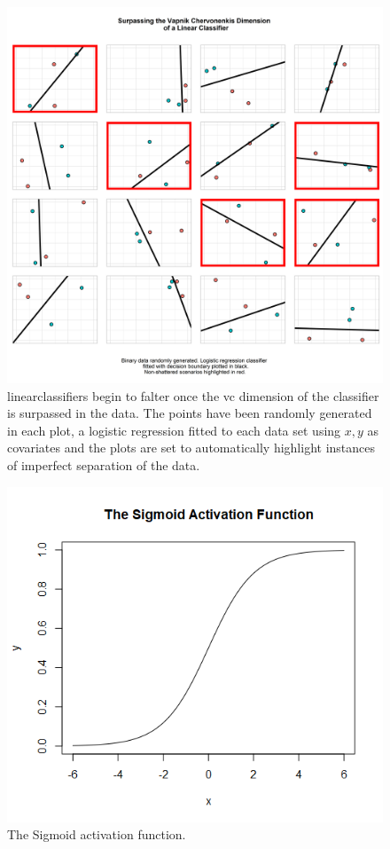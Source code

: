 \begin{figure}[h]
    \centering
    \includegraphics[width=120mm]{figs/vc_4.png}
    \caption[Surpassing the \gls{vc} dimension of a linear classifier - the data is not always shattered.]{\Gls{linearclassifier}s begin to falter once the \gls{vc} dimension of the classifier is surpassed in the data. The points have been randomly generated in each plot, a logistic regression fitted to each data set using $x, y$ as covariates and the plots are set to automatically highlight instances of imperfect separation of the data.}
    \label{fig:vc_4}
\end{figure}

\begin{figure}
    \includegraphics[scale=0.5]{figs/sigmoid.png}
    \caption{The Sigmoid activation function.}
    \label{fig:sigmoid_function}
\end{figure}

